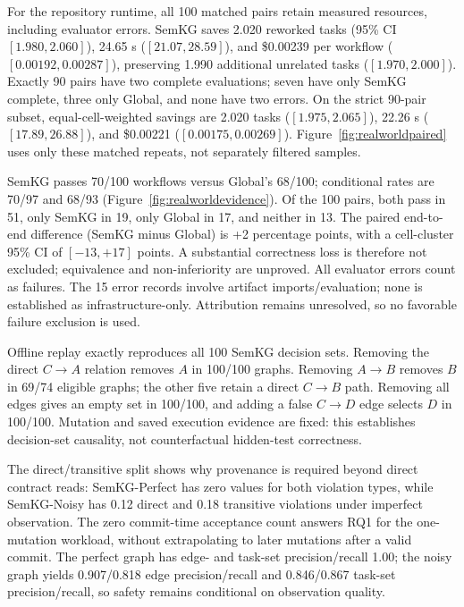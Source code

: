 \documentclass[a4paper,runningheads]{llncs}
\begin{document}
For the repository runtime, all 100 matched pairs retain measured resources, including evaluator errors. SemKG saves 2.020 reworked tasks (95\% CI $[1.980,2.060]$), 24.65 s ($[21.07,28.59]$), and \$0.00239 per workflow ($[0.00192,0.00287]$), preserving 1.990 additional unrelated tasks ($[1.970,2.000]$). Exactly 90 pairs have two complete evaluations; seven have only SemKG complete, three only Global, and none have two errors. On the strict 90-pair subset, equal-cell-weighted savings are 2.020 tasks ($[1.975,2.065]$), 22.26 s ($[17.89,26.88]$), and \$0.00221 ($[0.00175,0.00269]$). Figure~\ref{fig:realworldpaired} uses only these matched repeats, not separately filtered samples.

SemKG passes 70/100 workflows versus Global's 68/100; conditional rates are 70/97 and 68/93 (Figure~\ref{fig:realworldevidence}). Of the 100 pairs, both pass in 51, only SemKG in 19, only Global in 17, and neither in 13. The paired end-to-end difference (SemKG minus Global) is +2 percentage points, with a cell-cluster 95\% CI of $[-13,+17]$ points. A substantial correctness loss is therefore not excluded; equivalence and non-inferiority are unproved. All evaluator errors count as failures. The 15 error records involve artifact imports/evaluation; none is established as infrastructure-only. Attribution remains unresolved, so no favorable failure exclusion is used.

Offline replay exactly reproduces all 100 SemKG decision sets. Removing the direct $C\rightarrow A$ relation removes $A$ in 100/100 graphs. Removing $A\rightarrow B$ removes $B$ in 69/74 eligible graphs; the other five retain a direct $C\rightarrow B$ path. Removing all edges gives an empty set in 100/100, and adding a false $C\rightarrow D$ edge selects $D$ in 100/100. Mutation and saved execution evidence are fixed: this establishes decision-set causality, not counterfactual hidden-test correctness.

The direct/transitive split shows why provenance is required beyond direct contract reads: SemKG-Perfect has zero values for both violation types, while SemKG-Noisy has 0.12 direct and 0.18 transitive violations under imperfect observation. The zero commit-time acceptance count answers RQ1 for the one-mutation workload, without extrapolating to later mutations after a valid commit. The perfect graph has edge- and task-set precision/recall 1.00; the noisy graph yields 0.907/0.818 edge precision/recall and 0.846/0.867 task-set precision/recall, so safety remains conditional on observation quality.
\end{document}
